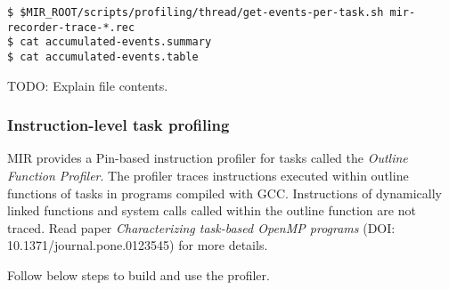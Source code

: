 \documentclass[11pt,a4paper]{article}
\begin{document}
\begin{lstlisting}[style=MyInputStyle]
$ $MIR_ROOT/scripts/profiling/thread/get-events-per-task.sh mir-recorder-trace-*.rec
$ cat accumulated-events.summary
$ cat accumulated-events.table
\end{lstlisting}

TODO: Explain file contents.

\subsubsection{Instruction-level task profiling}\label{instruction-level-task-profiling}

MIR provides a Pin-based instruction profiler for tasks called the \textit{Outline Function Profiler}.
The profiler traces instructions executed within outline functions of tasks in programs compiled with GCC. Instructions of dynamically linked functions and system calls called within the outline function are not traced. Read paper \textit{Characterizing task-based OpenMP programs} (DOI: 10.1371/journal.pone.0123545) for more details.

Follow below steps to build and use the profiler.
\end{document}
